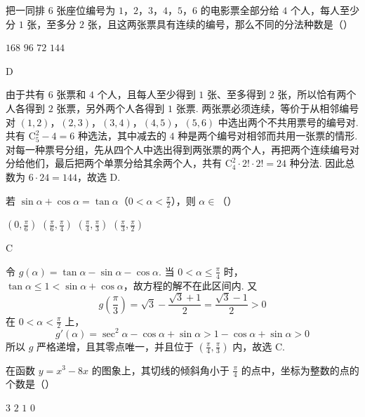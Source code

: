 \begin{problem}
把一同排 \(6\) 张座位编号为 \(1\)，\(2\)，\(3\)，\(4\)，\(5\)，\(6\) 的电影票全部分给 \(4\) 个人，每人至少分 \(1\) 张，至多分 \(2\) 张，且这两张票具有连续的编号，那么不同的分法种数是（\quad）

\choices
    {\(168\)}
    {\(96\)}
    {\(72\)}
    {\(144\)}
\end{problem}

\begin{answer}
D
\end{answer}

\begin{solution}
由于共有 \(6\) 张票和 \(4\) 个人，且每人至少得到 \(1\) 张、至多得到 \(2\) 张，所以恰有两个人各得到 \(2\) 张票，另外两个人各得到 \(1\) 张票. 两张票必须连续，等价于从相邻编号对
\((1,2)\)，\((2,3)\)，\((3,4)\)，\((4,5)\)，\((5,6)\)
中选出两个不共用票号的编号对. 共有 \(\mathrm C_5^2-4=6\) 种选法，其中减去的 \(4\) 种是两个编号对相邻而共用一张票的情形. 对每一种票号分组，先从四个人中选出得到两张票的两个人，再把两个连续编号对分给他们，最后把两个单票分给其余两个人，共有 \(\mathrm C_4^2\cdot2!\cdot2!=24\) 种分法. 因此总数为 \(6\cdot24=144\)，故选 D.
\end{solution}

\begin{problem}
若 \(\sin \alpha + \cos \alpha = \tan \alpha\)（\(0 < \alpha < \frac{\pi}{2}\)），则 \(\alpha \in\)（\quad）

\choices
    {\(\left(0, \frac{\pi}{6}\right)\)}
    {\(\left(\frac{\pi}{6}, \frac{\pi}{4}\right)\)}
    {\(\left(\frac{\pi}{4}, \frac{\pi}{3}\right)\)}
    {\(\left(\frac{\pi}{3}, \frac{\pi}{2}\right)\)}
\end{problem}

\begin{answer}
C
\end{answer}

\begin{solution}
令 \(g(\alpha)=\tan\alpha-\sin\alpha-\cos\alpha\). 当 \(0<\alpha\leqslant\frac\pi4\) 时，\(\tan\alpha\leqslant1<\sin\alpha+\cos\alpha\)，故方程的解不在此区间内. 又
\[
g\left(\frac\pi3\right)=\sqrt3-\frac{\sqrt3+1}{2}=\frac{\sqrt3-1}{2}>0
\]
在 \(0<\alpha<\frac\pi2\) 上，
\[
g'(\alpha)=\sec^2\alpha-\cos\alpha+\sin\alpha>1-\cos\alpha+\sin\alpha>0
\]
所以 \(g\) 严格递增，且其零点唯一，并且位于 \(\left(\frac\pi4,\frac\pi3\right)\) 内，故选 C.
\end{solution}

\begin{problem}
在函数 \( y = x^3 - 8x \) 的图象上，其切线的倾斜角小于 \( \frac{\pi}{4} \) 的点中，坐标为整数的点的个数是（\quad）

\choices
    {\(3\)}
    {\(2\)}
    {\(1\)}
    {\(0\)}
\end{problem}

